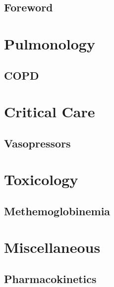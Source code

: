 \documentclass[10pt,openany]{book}
\begin{document}




\renewcommand{\contentsname}{\color{mainColor} Contents}
\tableofcontents

\chapter*{Foreword}



\part{Pulmonology}

\begin{refsection}
	\chapter{COPD} \label{ch:copd}
	
\end{refsection}

%
%	

\part{Critical Care}

\begin{refsection}
\chapter{Vasopressors} \label{ch:vasopressors}

\end{refsection}

\part{Toxicology}

\begin{refsection}
\chapter{Methemoglobinemia} \label{ch:methemoglobinemia}

\end{refsection}


\part{Miscellaneous}

\begin{refsection}
\chapter{Pharmacokinetics} \label{ch:pk}

\end{refsection}
\end{document}
